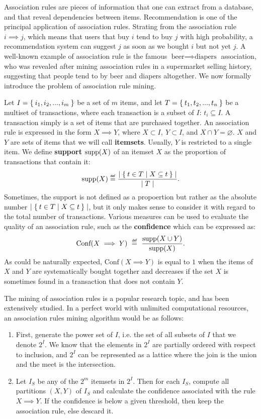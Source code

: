 Association rules are pieces of information that one can extract from a
database, and that reveal dependencies between items. Recommendation is one of
the principal application of association rules. Strating from the association
rule $i \implies j$, which means that users that buy $i$ tend to buy $j$ with
high probability, a recommendation system can suggest $j$ as soon as we bought
$i$ but not yet $j$. A well-known example of association rule is the famous
$\text{beer} \implies \text{diapers}$ association, who was revealed after
mining association rules in a supermarket selling history, suggesting that
people tend to by beer and diapers altogether. We now formally introduce the
problem of association rule mining.

Let $I = \Set{i_1, i_2, ..., i_m}$ be a set of $m$ items, and let $T =
\Set{t_1, t_2, ..., t_n}$ be a multiset of transactions, where each transaction
is a subset of $I$: $t_i \subseteq I$. A transaction simply is a set of items
that are purchased together. An association rule is expressed in the form $ X
\implies
Y$, where $ X \subset I, ~ Y \subset I$, and $X \cap Y = \varnothing$. $X$ and
$ Y $ are sets of items that we will call \textbf {itemsets}. Usually, $Y$ is
restricted to a single item. We define
\textbf{support} $\text{supp} (X) $ of an itemset $X$ as the proportion of
transactions that contain it:
$$\supp(X) \eqdef \frac{\mid \Set{t \in T | X \subseteq t}\mid}{\mid T \mid}.$$
Sometimes, the support is not defined as a propoertion but rather as the
absolute number $\mid \Set{t \in T | X \subseteq t}\mid$, but it only makes
sense to consider it with regard to the total number of transactions. Various
measures can be used to evaluate the quality of an association rule, such as
the \textbf{confidence } which can be expressed as:
$$\text{Conf}(X \implies Y)~\eqdef~\frac{\supp (X \cup Y)}{\supp (X)}.$$
As could be naturally expected, $\text{Conf}(X \implies Y)$ is equal to $1$
when the items of $X$ and $Y$ are systematically bought together and decreases
if the set $X$ is sometimes found in a transaction that does not contain $Y$.

The mining of association rules is a popular research topic, and has been
extensively studied. In a perfect world with unlimited computational resources,
an association rules mining algorithm would be as follows:
\begin{enumerate}
\item First, generate the power set of $I$, i.e. the set of all subsets of $I$
  that we denote $2^I$.  We know that the elements in $2^I$ are partially
  ordered with respect to inclusion, and $2^I$ can be represented as a lattice
  where the join is the union and the meet is the intersection.
\item Let $I_S$ be any of the $2^m$ itemsets in $2^I$. Then for each $I_S$,
  compute all partitions $(X, Y)$ of $I_S$ and calculate the confidence
    associated with the rule $X \implies Y$. If the confidence is below a given
    threshold, then keep the association rule, else descard it.
\end{enumerate}

